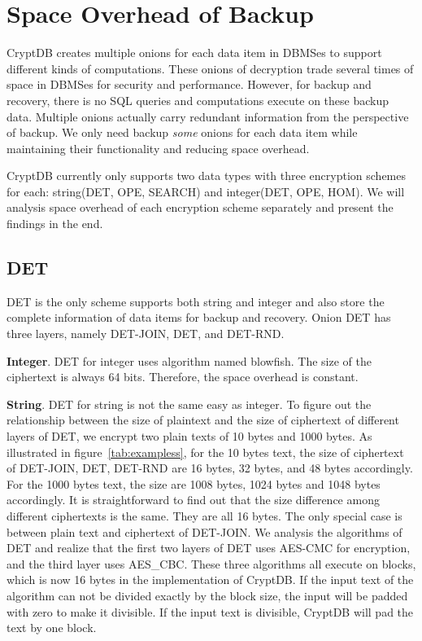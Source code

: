 \section{Space Overhead of Backup}

CryptDB creates multiple onions for each data item in DBMSes to support different kinds of computations. These onions of decryption trade several times of space in DBMSes for security and performance. However, for backup and recovery, there is no SQL queries and computations execute on these backup data. Multiple onions actually carry redundant information from the perspective of backup. We only need backup \textit{some} onions for each data item while maintaining their functionality and reducing space overhead. 


CryptDB currently only supports two data types with three encryption schemes for each: string(DET, OPE, SEARCH) and integer(DET, OPE, HOM). We will analysis space overhead of each encryption scheme separately and present the findings in the end.

\subsection{DET}
DET is the only scheme supports both string and integer and also store the complete information of data items for backup and recovery. Onion DET has three layers, namely DET-JOIN, DET, and DET-RND. 

\textbf{Integer}. DET for integer uses algorithm named blowfish. The size of the ciphertext is always 64 bits. Therefore, the space overhead is constant.

\textbf{String}. DET for string is not the same easy as integer. To figure out the relationship between the size of plaintext and the size of ciphertext of different layers of DET, we encrypt two plain texts of 10 bytes and 1000 bytes. As illustrated in figure~\ref{tab:exampless}, for the 10 bytes text, the size of ciphertext of DET-JOIN, DET, DET-RND are 16 bytes, 32 bytes, and 48 bytes accordingly. For the 1000 bytes text, the size are 1008 bytes, 1024 bytes and 1048 bytes accordingly. It is straightforward to find out that the size difference among different ciphertexts is the same. They are all 16 bytes. The only special case is between plain text and ciphertext of DET-JOIN. We analysis the algorithms of DET and realize that the first two layers of DET uses AES-CMC for encryption, and the third layer uses AES\_CBC. These three algorithms all execute on blocks, which is now 16 bytes in the implementation of CryptDB. If the input text of the algorithm can not be divided exactly by the block size, the input will be padded with zero to make it divisible. If the input text is divisible, CryptDB will pad the text by one block. 


